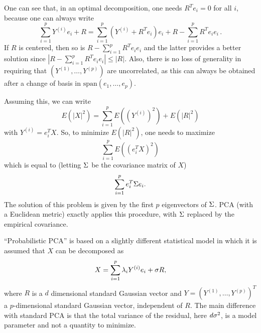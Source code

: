 One can see that, in an optimal
decomposition, one needs $R^T{e_i} = 0$ for all $i$, because one
can always write
\[
\sum_{i=1}^p Y^{(i)} e_i + R = \sum_{i=1}^p (Y^{(i)} + {R^T}{e_i}) e_i +
R - \sum_{i=1}^p {R^T}{e_i} e_i\,.
\]
If $R$ is centered, then so is $R - \sum_{i=1}^p {R^T}{e_i} e_i$ 
and the latter provides a better solution since $|R - \sum_{i=1}^p {R^T}{e_i} e_i| \leq |R|$. Also, there is no loss of generality in requiring that $(Y^{(1)}, \ldots, Y^{(p)})$ are uncorrelated, as this can always be obtained after  a change of
basis in $\text{span}(e_1, \ldots, e_p)$. 

Assuming this, we can write
$$
E(|X|^2) = \sum_{i=1}^p E((Y^{(i)})^2) + E(|R|^2)
$$
with $Y^{(i)} = {e_i^T}{X}$. So, to minimize $E(|R|^2)$, one needs to
maximize 
$$\sum_{i=1}^p E(({e_i^T}{X})^2)$$
 which is equal to (letting $\Sigma$ be the covariance matrix of $X$)
$$
\sum_{i=1}^p e_i^T \Sigma e_i.
$$
The solution of this problem is given by the first $p$
eigenvectors of $\Sigma$. PCA (with a Euclidean metric) exactly applies this procedure, with
$\Sigma$ replaced by the empirical covariance. 

\bigskip
``Probabilistic PCA'' is based on a slightly different statistical model in which it is
assumed that $X$ can be decomposed as 
\[
X = \sum_{i=1}^p \lambda_i Y^{(i)} e_i + \sigma R,
\]
 where $R$ is a $d$ dimensional standard
Gaussian vector and $Y = (Y^{(1)}, \ldots, Y^{(p)})^T$ a $p$-dimensional
standard Gaussian vector, independent of $R$. The main difference with standard PCA is that the total variance of the residual, here $d\sigma^2$, is a model parameter and not a quantity to minimize. 

